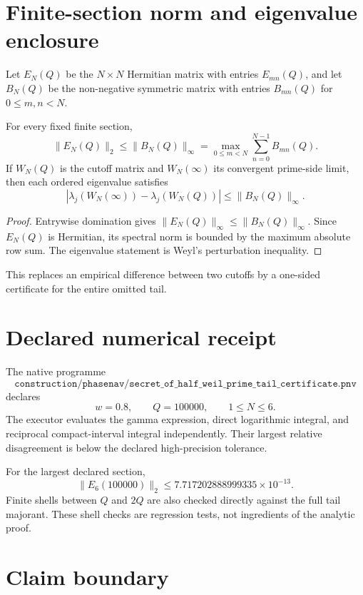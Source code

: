 \section{Finite-section norm and eigenvalue enclosure}

Let $E_N(Q)$ be the $N\times N$ Hermitian matrix with entries $E_{mn}(Q)$,
and let $B_N(Q)$ be the non-negative symmetric matrix with entries
$B_{mn}(Q)$ for $0\le m,n<N$.

\begin{corollary}
\label{cor:operator-tail-certificate}
For every fixed finite section,
\[
 \|E_N(Q)\|_2
 \le
 \|B_N(Q)\|_\infty
 =
 \max_{0\le m<N}
 \sum_{n=0}^{N-1}B_{mn}(Q).
\]
If $W_N(Q)$ is the cutoff matrix and $W_N(\infty)$ its convergent
prime-side limit, then each ordered eigenvalue satisfies
\[
 \left|
 \lambda_j\!\left(W_N(\infty)\right)
 -
 \lambda_j\!\left(W_N(Q)\right)
 \right|
 \le
 \|B_N(Q)\|_\infty.
\]
\end{corollary}

\begin{proof}
Entrywise domination gives
$\|E_N(Q)\|_\infty\le\|B_N(Q)\|_\infty$. Since $E_N(Q)$ is Hermitian,
its spectral norm is bounded by the maximum absolute row sum. The
eigenvalue statement is Weyl's perturbation inequality.
\end{proof}

This replaces an empirical difference between two cutoffs by a one-sided
certificate for the entire omitted tail.

\section{Declared numerical receipt}

The native programme
\[
 \texttt{construction/phasenav/secret\_of\_half\_weil\_prime\_tail\_certificate.pnv}
\]
declares
\[
 w=0.8,
 \qquad
 Q=100000,
 \qquad
 1\le N\le6.
\]
The executor evaluates the gamma expression, direct logarithmic integral, and
reciprocal compact-interval integral independently. Their largest relative
disagreement is below the declared high-precision tolerance.

For the largest declared section,
\[
 \boxed{
 \|E_6(100000)\|_2
 \le
 7.717202888999335\times10^{-13}
 }.
\]
Finite shells between $Q$ and $2Q$ are also checked directly against the full
tail majorant. These shell checks are regression tests, not ingredients of
the analytic proof.

\section{Claim boundary}

